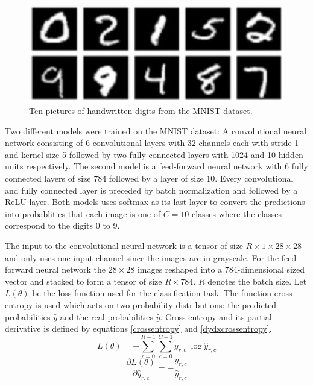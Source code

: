 \documentclass[a4paper,11pt,twoside]{article}
\newcommand*{\pd}[2]{\ensuremath{\dfrac{\partial #1}{\partial #2}}}
\begin{document}
\begin{figure}[h]
	\centering
  		\includegraphics[scale=1]{mnist.png}
  	\caption{Ten pictures of handwritten digits from the MNIST dataset. \cite{MNIST}} \label{figMNIST}
\end{figure}

Two different models were trained on the MNIST dataset: A convolutional neural network consisting of 6 convolutional layers with 32 channels each with stride 1 and kernel size 5 followed by two fully connected layers with 1024 and 10 hidden units respectively. The second model is a feed-forward neural network with 6 fully connected layers of size 784 followed by a layer of size 10. Every convolutional and fully connected layer is preceded by batch normalization and followed by a ReLU layer. Both models uses softmax as its last layer to convert the predictions into probablities that each image is one of $C=10$ classes where the classes correspond to the digits 0 to 9. \cite{cs231n}

The input to the convolutional neural network is a tensor of size $R \times 1 \times 28 \times 28$ and only uses one input channel since the images are in grayscale. For the feed-forward neural network the $28 \times 28$ images reshaped into a 784-dimensional sized vector and stacked to form a tensor of size $R \times 784$. $R$ denotes the batch size. Let $L(\theta)$ be the loss function used for the classification task. The function cross entropy is used which acts on two probability distributions: the predicted probabilities $\hat{y}$ and the real probabilities $\hat{y}$. Cross entropy and its partial derivative is defined by equations \eqref{crossentropy} and \eqref{dydxcrossentropy}. \cite{cs231n} \cite{notesonbackprop}
\begin{equation}\label{crossentropy}
L(\theta) = - \sum^{R-1}_{r=0} \sum^{C-1}_{c=0}y_{r,c} \ \log{\hat{y}_{r,c}}
\end{equation}
\begin{equation}\label{dydxcrossentropy}
\pd{L(\theta)}{\hat{y}_{r,c}} = - \frac{y_{r,c}}{\hat{y}_{r,c}}
\end{equation}
\end{document}
